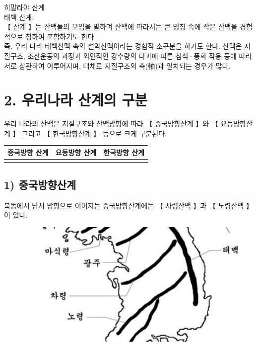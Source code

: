 \documentclass[12pt,a4paper]{book}
\newcommand{\SectionMargin}			{\newpage  \null \vskip 0cm}
\begin{document}
	히말라야 산계\\	
	태백 산계. \\

	【 산계 】는 산맥들의 모임을 말하며 산맥에 따라서는 큰 명칭 속에 작은 산맥을 
	경험적으로 칭하여 포함하기도 한다.\\

	즉, 우리 나라 태백산맥 속의 설악산맥이라는 경험적 소구분을 하기도 한다. 
	산맥은 지질구조, 조산운동의 과정과 외인적인 강수량의 다과에 따른 침식·풍화 작용 등에 따라 서로 상관하여 이루어지며, 
	대체로 지질구조의 축(軸)과 일치되는 경우가 많다. \\


	\SectionMargin
	\section{2. 우리나라 산계의 구분}
	\null


		우리 나라의 산맥은 지질구조와 산맥방향에 따라 【 중국방향산계 】와 【 요동방향산계 】 그리고 【 한국방향산계 】 등으로 크게 구분된다.\\


		\begin{table}[hbp]
		\centering 
		\begin{tabular}{ p{} p{} p{0.3\textwidth} }
		\toprule
		중국방향 산계	&요동방향 산계	&한국방향 산계\\
		\midrule
		&&\\	
		\bottomrule
		\end{tabular} 
		\end{table}




		\newpage  \null
		\subsection{1) 중국방향산계}
		\null



		북동에서 남서 방향으로 이어지는 중국방향산계에는 【 차령산맥 】과 【 노령산맥 】이 있다. 
		
				\includegraphics[width=1.0\textwidth]{./fig/fig__111.pdf}
\end{document}
